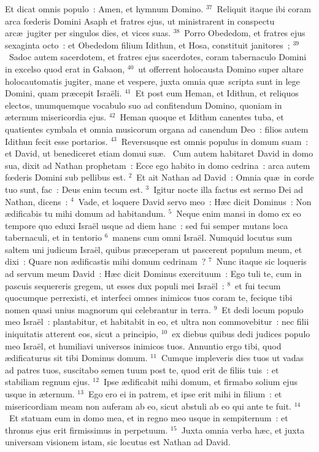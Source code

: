  Et dicat omnis populo~: Amen, et hymnum Domino.
${}^{37}$~Reliquit itaque ibi coram arca fœderis Domini Asaph et fratres ejus, ut ministrarent in conspectu arc\ae\ jugiter per singulos dies, et vices suas.
${}^{38}$~Porro Obededom, et fratres ejus sexaginta octo~: et Obededom filium Idithun, et Hosa, constituit janitores~;
${}^{39}$~Sadoc autem sacerdotem, et fratres ejus sacerdotes, coram tabernaculo Domini in excelso quod erat in Gabaon,
${}^{40}$~ut offerrent holocausta Domino super altare holocautomatis jugiter, mane et vespere, juxta omnia qu\ae\ scripta sunt in lege Domini, quam pr\ae cepit Isra\"eli.
${}^{41}$~Et post eum Heman, et Idithun, et reliquos electos, unumquemque vocabulo suo ad confitendum Domino, quoniam in \ae ternum misericordia ejus.
${}^{42}$~Heman quoque et Idithun canentes tuba, et quatientes cymbala et omnia musicorum organa ad canendum Deo~: filios autem Idithun fecit esse portarios.
${}^{43}$~Reversusque est omnis populus in domum suam~: et David, ut benediceret etiam domui su\ae .
~\lettrine[lines=10,image=true,loversize=0.05,lraise=-0.03]{C}{}um autem habitaret David in domo sua, dixit ad Nathan prophetam~: Ecce ego habito in domo cedrina~: arca autem fœderis Domini sub pellibus est.
${}^{2}$~Et ait Nathan ad David~: Omnia qu\ae\ in corde tuo sunt, fac~: Deus enim tecum est.
${}^{3}$~Igitur nocte illa factus est sermo Dei ad Nathan, dicens~:
${}^{4}$~Vade, et loquere David servo meo~: H\ae c dicit Dominus~: Non \ae dificabis tu mihi domum ad habitandum.
${}^{5}$~Neque enim mansi in domo ex eo tempore quo eduxi Isra\"el usque ad diem hanc~: sed fui semper mutans loca tabernaculi, et in tentorio
${}^{6}$~manens cum omni Isra\"el. Numquid locutus sum saltem uni judicum Isra\"el, quibus pr\ae ceperam ut pascerent populum meum, et dixi~: Quare non \ae dificastis mihi domum cedrinam~?
${}^{7}$~Nunc itaque sic loqueris ad servum meum David~: H\ae c dicit Dominus exercituum~: Ego tuli te, cum in pascuis sequereris gregem, ut esses dux populi mei Isra\"el~:
${}^{8}$~et fui tecum quocumque perrexisti, et interfeci omnes inimicos tuos coram te, fecique tibi nomen quasi unius magnorum qui celebrantur in terra.
${}^{9}$~Et dedi locum populo meo Isra\"el~: plantabitur, et habitabit in eo, et ultra non commovebitur~: nec filii iniquitatis atterent eos, sicut a principio,
${}^{10}$~ex diebus quibus dedi judices populo meo Isra\"el, et humiliavi universos inimicos tuos. Annuntio ergo tibi, quod \ae dificaturus sit tibi Dominus domum.
${}^{11}$~Cumque impleveris dies tuos ut vadas ad patres tuos, suscitabo semen tuum post te, quod erit de filiis tuis~: et stabiliam regnum ejus.
${}^{12}$~Ipse \ae dificabit mihi domum, et firmabo solium ejus usque in \ae ternum.
${}^{13}$~Ego ero ei in patrem, et ipse erit mihi in filium~: et misericordiam meam non auferam ab eo, sicut abstuli ab eo qui ante te fuit.
${}^{14}$~Et statuam eum in domo mea, et in regno meo usque in sempiternum~: et thronus ejus erit firmissimus in perpetuum.
${}^{15}$~Juxta omnia verba h\ae c, et juxta universam visionem istam, sic locutus est Nathan ad David.


